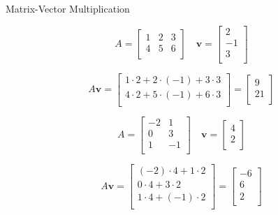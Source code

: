 \documentclass{beamer}
\begin{document}
\begin{frame}{Matrix-Vector Multiplication}
  \begin{example}
    \[
      A = \begin{bmatrix}
        1 & 2 & 3 \\
        4 & 5 & 6 \\
      \end{bmatrix}
      \quad
      \mathbf{v} = \begin{bmatrix}
        2 \\
        -1 \\
        3 \\
      \end{bmatrix}
    \]

    \[
      A\mathbf{v} = \begin{bmatrix}
        1 \cdot 2 + 2 \cdot (-1) + 3 \cdot 3 \\
        4 \cdot 2 + 5 \cdot (-1) + 6 \cdot 3 \\
      \end{bmatrix}
      = \begin{bmatrix}
        9 \\
        21 \\
      \end{bmatrix}
    \]
  \end{example}

  \pause

  \begin{example}
    \[
      A = \begin{bmatrix}
        -2 & 1 \\
        0 & 3 \\
        1 & -1 \\
      \end{bmatrix}
      \quad
      \mathbf{v} = \begin{bmatrix}
        4 \\
        2 \\
      \end{bmatrix}
    \]

    \[
      A\mathbf{v} = \begin{bmatrix}
        (-2) \cdot 4 + 1 \cdot 2 \\
        0 \cdot 4 + 3 \cdot 2 \\
        1 \cdot 4 + (-1) \cdot 2 \\
      \end{bmatrix}
      = \begin{bmatrix}
        -6 \\
        6 \\
        2 \\
      \end{bmatrix}
    \]
  \end{example}


\end{frame}
\end{document}
